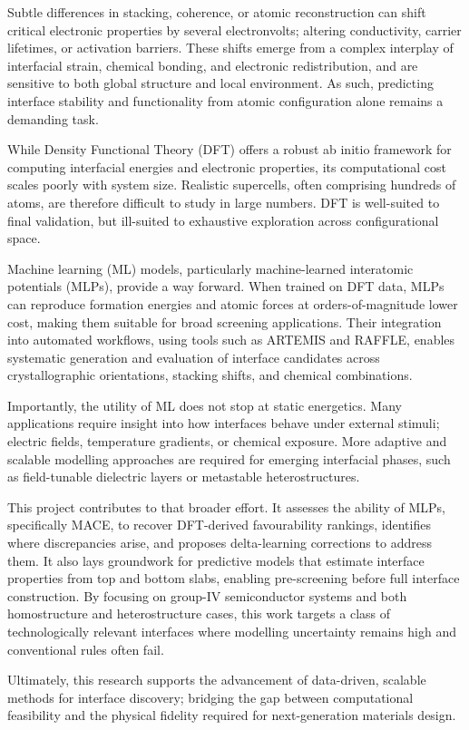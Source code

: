 Subtle differences in stacking, coherence, or atomic reconstruction can shift critical electronic properties by several electronvolts; altering conductivity, carrier lifetimes, or activation barriers. These shifts emerge from a complex interplay of interfacial strain, chemical bonding, and electronic redistribution, and are sensitive to both global structure and local environment. As such, predicting interface stability and functionality from atomic configuration alone remains a demanding task.

While Density Functional Theory (DFT) offers a robust ab initio framework for computing interfacial energies and electronic properties, its computational cost scales poorly with system size. Realistic supercells, often comprising hundreds of atoms, are therefore difficult to study in large numbers. DFT is well-suited to final validation, but ill-suited to exhaustive exploration across configurational space.

Machine learning (ML) models, particularly machine-learned interatomic potentials (MLPs), provide a way forward. When trained on DFT data, MLPs can reproduce formation energies and atomic forces at orders-of-magnitude lower cost, making them suitable for broad screening applications.  Their integration into automated workflows, using tools such as ARTEMIS and RAFFLE, enables systematic generation and evaluation of interface candidates across crystallographic orientations, stacking shifts, and chemical combinations.

Importantly, the utility of ML does not stop at static energetics. Many applications require insight into how interfaces behave under external stimuli; electric fields, temperature gradients, or chemical exposure. More adaptive and scalable modelling approaches are required for emerging interfacial phases, such as field-tunable dielectric layers or metastable heterostructures.

This project contributes to that broader effort. It assesses the ability of MLPs, specifically MACE, to recover DFT-derived favourability rankings, identifies where discrepancies arise, and proposes delta-learning corrections to address them. It also lays groundwork for predictive models that estimate interface properties from top and bottom slabs, enabling pre-screening before full interface construction. By focusing on group-IV semiconductor systems and both homostructure and heterostructure cases, this work targets a class of technologically relevant interfaces where modelling uncertainty remains high and conventional rules often fail.

Ultimately, this research supports the advancement of data-driven, scalable methods for interface discovery; bridging the gap between computational feasibility and the physical fidelity required for next-generation materials design.